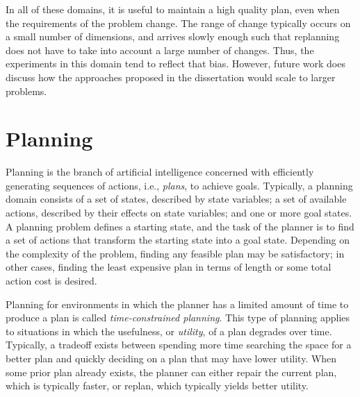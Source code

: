 In all of these domains, it is useful to maintain a high quality plan, even when the requirements of the problem change.  The range of change typically occurs on a small number of dimensions, and arrives slowly enough such that replanning does not have to take into account a large number of changes.  Thus, the experiments in this domain tend to reflect that bias.  However, future work does discuss how the approaches proposed in the dissertation would scale to larger problems.



\section{Planning}

Planning is the branch of artificial intelligence concerned with efficiently generating sequences of actions, i.e., \textit{plans}, to achieve goals.  Typically, a planning domain consists of a set of states, described by state variables; a set of available actions, described by their effects on state variables; and one or more goal states.  A planning problem defines a starting state, and the task of the planner is to find a set of actions that transform the starting state into a goal state.  Depending on the complexity of the problem, finding any feasible plan may be satisfactory; in other cases, finding the least expensive plan in terms of length or some total action cost is desired.

Planning for environments in which the planner has a limited amount of time to produce a plan is called \textit{time-constrained planning}.  This type of planning applies to situations in which the usefulness, or \textit{utility}, of a plan degrades over time.  Typically, a tradeoff exists between spending more time searching the space for a better plan and quickly deciding on a plan that may have lower utility.  When some prior plan already exists, the planner can either repair the current plan, which is typically faster, or replan, which typically yields better utility.



